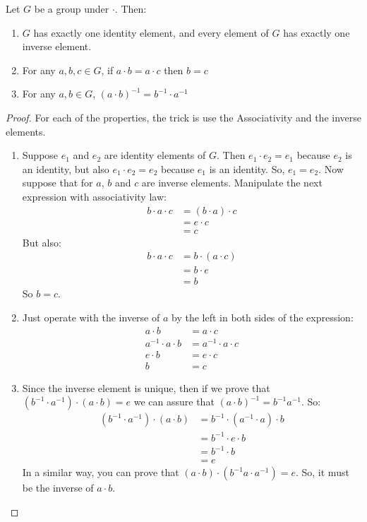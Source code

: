 \documentclass{tufte-handout}
\begin{document}
\begin{theorem}
	Let $G$ be a group under $\cdot$. Then:
	\begin{enumerate}
		\item $G$ has exactly one identity element, and every element of $G$ has exactly one inverse element.
		\item For any $a, b, c \in G$, if $a \cdot b = a \cdot c$ then $b = c$
		\item For any $a, b \in G$, $(a\cdot b)^{-1} = b^{-1}\cdot a^{-1}$ 
	\end{enumerate}
\end{theorem}
\begin{proof}
	For each of the properties, the trick is use the Associativity and the inverse elements.
	\begin{enumerate}
		\item Suppose $e_1$ and $e_2$ are identity elements of $G$. Then $e_1 \cdot e_2 = e_1$ because $e_2$ is an identity, but also $e_1 \cdot e_2 = e_2$ because $e_1$ is an identity. So, $e_1 = e_2$. Now suppose that for $a$, $b$ and $c$ are inverse elements. Manipulate the next expression with associativity law:
		\begin{align*}
			b \cdot a \cdot c &= (b \cdot a) \cdot c\\
			&= e \cdot c\\
			&= c
		\end{align*}
		But also:
		\begin{align*}
			b \cdot a \cdot c &= b \cdot (a \cdot c)\\
			&= b \cdot e\\
			&= b
		\end{align*}
		So $b = c$.

		\item Just operate with the inverse of $a$ by the left in both sides of the expression:
		\begin{align*}
			a \cdot b &= a \cdot c\\
			a^{-1} \cdot a \cdot b &= a^{-1} \cdot a \cdot c\\
			e \cdot b &= e \cdot c\\
			b &= c
		\end{align*}

		\item Since the inverse element is unique, then if we prove that $(b^{-1}\cdot a^{-1}) \cdot (a \cdot b) = e$ we can assure that $(a\cdot b)^{-1} = b^{-1}a^{-1}$. So:
		\begin{align*}
			(b^{-1} \cdot a^{-1}) \cdot (a \cdot b) &= b^{-1} \cdot (a^{-1} \cdot a) \cdot b\\
			&= b^{-1} \cdot e \cdot b\\
			&= b^{-1} \cdot b\\
			&= e
		\end{align*}
		In a similar way, you can prove that $(a \cdot b) \cdot (b^{-1}a\cdot a^{-1}) = e$. So, it must be the inverse of $a \cdot b$.
	\end{enumerate}
\end{proof}
\end{document}
